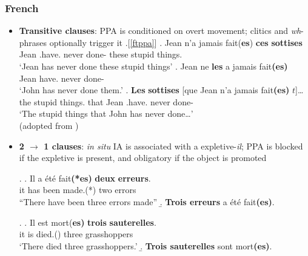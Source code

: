 \documentclass[letterpaper,10pt]{handout_nick}
\begin{document}
\subsubsection{French}
\begin{itemize}
\item {\bf Transitive clauses}: PPA is conditioned on overt movement; clitics and \emph{wh}-phrases optionally trigger it
\ex.[\ref{ftppa}] \ag. Jean n'a jamais fait({\bf *es}) {\bf ces} {\bf sottises}\\
Jean .have. never done- these {stupid things}.\\
`Jean has never done these stupid things'
\bg. Jean ne {\bf les} a jamais fait{\bf (es)}\\
Jean   have. never done-\\
`John has never done them.'
\bg. {\bf Les} {\bf sottises} [que Jean n'a jamais fait{\bf (es)} $t$]\ldots\\
the {stupid things}. that Jean .have. never done-\\
`The stupid things that John has never done\ldots'\\ (adopted from \citealt{belletti06}) 

\item {\bf 2 $\rightarrow$ 1 clauses}: \emph{in situ} IA is associated with a expletive-\emph{il}; PPA is blocked if the expletive is present, and obligatory if the object is promoted
\begin{multicols}{2}
\ex. 
\ag. Il a \'et\'e fait{\bf (*es)} {\bf deux} {\bf erreurs}.\\
it has been made.(*) two errors\\
``There have been three errors made''
\b. {\bf Trois erreurs} a \'et\'e fait{\bf *(es)}.

\ex. 
\ag. Il est mort{(\bf *es)} {\bf trois} {\bf sauterelles}.\\
it is died.() three grasshoppers\\
`There died three grasshoppers.'
\b. {\bf Trois sauterelles} sont mort{\bf *(es)}.


\end{multicols}
\end{itemize}
\end{document}
